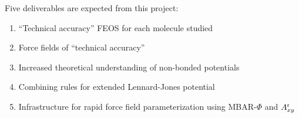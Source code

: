 \documentclass[12pt,a4paper]{article}
\begin{document}
Five deliverables are expected from this project:
\begin{enumerate}[nolistsep]
	\item ``Technical accuracy'' FEOS for each molecule studied
	\item Force fields of ``technical accuracy''
	\item Increased theoretical understanding of non-bonded potentials 
	\item Combining rules for extended Lennard-Jones potential
	\item Infrastructure for rapid force field parameterization using MBAR-$\Phi$ and $A_{xy}^{\rm r}$
\end{enumerate}
 

\end{document}

